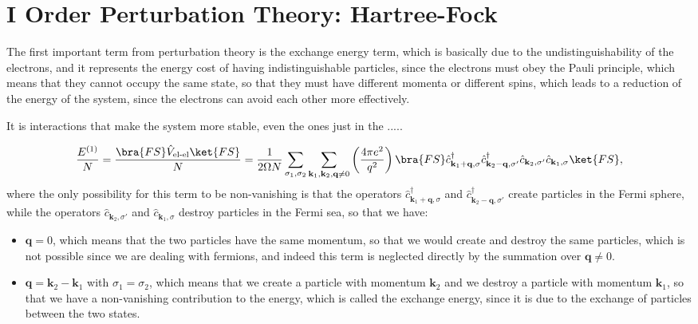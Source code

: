 \section{I Order Perturbation Theory: Hartree-Fock}


The first important term from perturbation theory is the exchange energy term, which is basically due to the undistinguishability of the electrons, and it represents the energy cost of having indistinguishable particles, since the electrons must obey the Pauli principle, which means that they cannot occupy the same state, so that they must have different momenta or different spins, which leads to a reduction of the energy of the system, since the electrons can avoid each other more effectively.

It is interactions that make the system more stable, even the ones just in the .....

\[
    \frac{E^{(1)}}{N} = \frac{\bra{FS} \hat{V}_{\text{el-el}}\ket{FS}}{N} = \frac{1}{2\Omega N} \sum_{\sigma_1, \sigma_2} \sum_{\mathbf{k}_1, \mathbf{k}_2, \mathbf{q}\neq 0} \left( \frac{4 \pi e^2}{q^2} \right) \bra{FS} \hat{c}_{\mathbf{k}_1 + \mathbf{q}, \sigma}^\dagger \hat{c}_{\mathbf{k}_2 - \mathbf{q}, \sigma'}^\dagger \hat{c}_{\mathbf{k}_2, \sigma'} \hat{c}_{\mathbf{k}_1, \sigma} \ket{FS},
\]
where the only possibility for this term to be non-vanishing is that the operators \(\hat{c}_{\mathbf{k}_1 + \mathbf{q}, \sigma}^\dagger\) and \(\hat{c}_{\mathbf{k}_2 - \mathbf{q}, \sigma'}^\dagger\) create particles in the Fermi sphere, while the operators \(\hat{c}_{\mathbf{k}_2, \sigma'}\) and \(\hat{c}_{\mathbf{k}_1, \sigma}\) destroy particles in the Fermi sea, so that we have:
\begin{itemize}
    \item \(\mathbf{q} = 0\), which means that the two particles have the same momentum, so that we would create and destroy the same particles, which is not possible since we are dealing with fermions, and indeed this term is neglected directly by the summation over \(\mathbf{q}\neq 0\).
    \item \(\mathbf{q} = \mathbf{k}_2 - \mathbf{k}_1\) with \(\sigma_1 = \sigma_2\), which means that we create a particle with momentum \(\mathbf{k}_2\) and we destroy a particle with momentum \(\mathbf{k}_1\), so that we have a non-vanishing contribution to the energy, which is called the exchange energy, since it is due to the exchange of particles between the two states.
\end{itemize}

